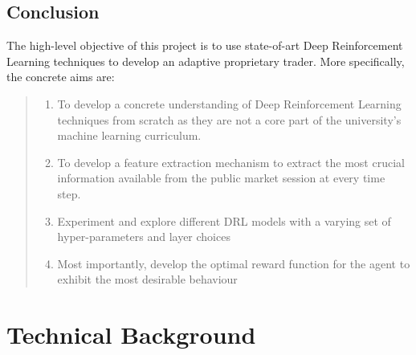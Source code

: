 \documentclass[ %
                    author={Ashwinder Khurana},
                supervisor={Prof Dave Cliff},
                    degree={MEng},
                     title={The Deeply Reinforced Trader},
                  subtitle={},
                      type={enterprise},
                      year={2020} ]{dissertation}
\begin{document}
\vspace{0.5cm}
\section{Conclusion}
\vspace{0.5cm} 

The high-level objective of this project is to use state-of-art Deep Reinforcement Learning techniques to develop an adaptive proprietary trader.  
More specifically, the concrete aims are:


\begin{quote}
\begin{enumerate}
\item To develop a concrete understanding of Deep Reinforcement Learning techniques from scratch as they are not a core part of the university's machine learning curriculum.
\item To develop a feature extraction mechanism to extract the most crucial information available from the public market session at every time step.
\item Experiment and explore different DRL models with a varying set of hyper-parameters and layer choices
\item Most importantly, develop the optimal reward function for the agent to exhibit the most desirable behaviour 
\end{enumerate}
\end{quote}


\chapter{Technical Background}
\label{chap:technical}




%
\end{document}
